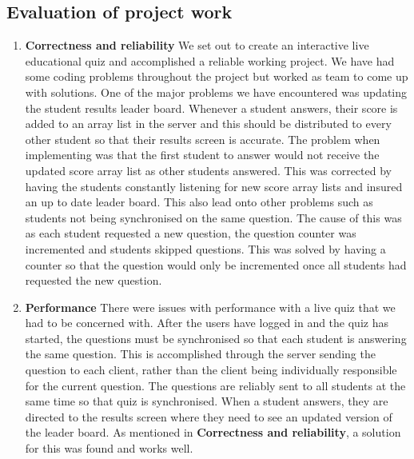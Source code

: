\subsection{Evaluation of project work}
\label{sub:evaluation_of_project_work}

\begin{enumerate}

	\item \textbf{Correctness and reliability}
		We set out to create an interactive live educational quiz and accomplished a
		reliable working project. We have had some coding problems throughout the 
		project but worked as team to come up with solutions. One of the major problems 
		we have encountered was updating the student results leader board. Whenever
		a student answers, their score is added	to an array list in the server and this
		should be distributed to every other student so that their results screen is
		accurate. The problem when implementing was that the first student to answer
		would not receive the updated score array list as other students answered.
		This was corrected by having the students constantly listening for new score
		array lists and insured an up to date leader board. This also lead onto other
		problems such as students not being synchronised on the same question. The cause
		of this was as each student requested a new question, the question counter was
		incremented and students skipped questions. This was solved by having a counter
		so that the question would only be incremented once all students had requested the
		new question.
	
	\item \textbf{Performance}
		There were issues with performance with a live quiz that we had to be concerned with.
		After the users have logged	in and the quiz has started, the questions must be 
		synchronised so that each student is answering the same question. This is accomplished 
		through the server sending the question to each client, rather than the client being 
		individually responsible for the current question. The questions are reliably sent to all 
		students at the same time so that quiz is synchronised. When a student answers, they are 
		directed to the results screen where they need to see an updated version of the leader board. 
		As mentioned in \textbf{Correctness and reliability}, a solution for this was found and works well.


\end{enumerate}
